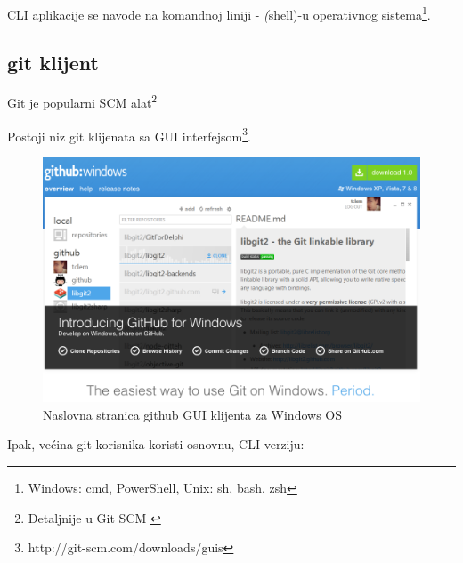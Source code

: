 \documentclass[times, utf8, seminar]{fit}
\begin{document}
CLI aplikacije se navode na komandnoj liniji - \emph(shell)-u operativnog sistema\footnote{Windows: cmd, PowerShell, Unix: sh, bash, zsh}.

\subsection{git klijent}
\label{sec:git}

Git je popularni SCM alat\footnote{Detaljnije u Git SCM \citep{agilegit}}

Postoji niz git klijenata sa GUI interfejsom\footnote{http://git-scm.com/downloads/guis}. 

\begin{figure}[H]
\centering
\includegraphics[width=12cm]{img/github_windows.png}
\caption{Naslovna stranica github GUI klijenta za Windows OS}
\end{figure}


Ipak, većina git korisnika koristi osnovnu, CLI verziju:
\end{document}
